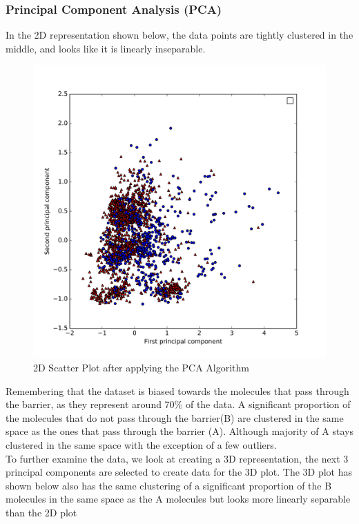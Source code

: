 \documentclass[a4paper,12pt]{report}
\begin{document}
			\subsubsection{Principal Component Analysis (PCA)}
						In the 2D representation shown below, the data points are tightly clustered in the middle, and looks like it is linearly inseparable.
						\begin{figure}[H]
							\centering
							\includegraphics[width=\textwidth,scale=1,totalheight=0.5\textheight]{images/scatter_pca}
							\caption{2D Scatter Plot after applying the PCA Algorithm}
							\label{fig:scatter_pca_2D}
						\end{figure}
						Remembering that the dataset is biased towards the molecules that pass through the barrier, as they represent around 70\% of the data. A significant proportion of the molecules that do not pass through the barrier(B) are clustered in the same space as the ones that pass through the barrier (A). Although majority of A stays clustered in the same space with the exception of a few outliers.\\
						To further examine the data, we look at creating a 3D representation, the next 3 principal components are selected to create data for the 3D plot. The 3D plot has shown below also has the same clustering of a significant proportion of the B molecules in the same space as the A molecules but looks more linearly separable than the 2D plot
\end{document}
